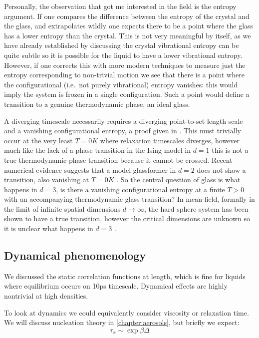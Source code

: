 Personally, the observation that got me interested in the field is the entropy argument.
If one compares the difference between the entropy of the crystal and the glass, and extrapolates wildly one expects there to be a point where the glass has a lower entropy than the crystal.
This is not very meaningful by itself, as we have already established by discussing the crystal vibrational entropy can be quite subtle so it is possible for the liquid to have a lower vibrational entropy.
However, if one corrects this with more modern techniques to measure just the entropy corresponding to non-trivial motion we see that there is a point where the configurational (i.e.\ not purely vibrational) entropy vanishes: this would imply the system is frozen in a single configuration.
Such a point would define a transition to a genuine thermodynamic phase, an ideal glass.

A diverging timescale necessarily requires a diverging point-to-set length scale and a vanishing configurational entropy, a proof given in \cite{?}.
This must trivially occur at the very least $T=0\si{K}$ where relaxation timescales diverges, however much like the lack of a phase transition in the Ising model in $d=1$ this is not a true thermodynamic phase transition because it cannot be crossed.
Recent numerical evidence suggests that a model glassformer in $d=2$ does not show a transition, also vanishing at $T=0\si{K}$ \cite{Berthier?}.
So the central question of glass is what happens in $d=3$, is there a vanishing configurational entropy at a finite $T > 0$ with an accompanying thermodynamic glass transition?
In mean-field, formally in the limit of infinite spatial dimensions $d \to \infty$, the hard sphere system has been shown to have a true transition, however the critical dimensions are unknown so it is unclear what happens in $d=3$ \cite{Parisi,Zamboni,Charbonneau,Kurchan,?,?}.


\subsection{Dynamical phenomenology}

We discussed the static correlation functions at length, which is fine for liquids where equilibrium occurs on 10ps timescale.
Dynamical effects are highly nontrivial at high densities.

To look at dynamics we could equivalently consider viscosity or relaxation time.
We will discuss nucleation theory in \ref{chapter:aerosols}, but briefly we expect:
\begin{equation*}
  \tau_x \sim \exp{ \beta \Delta}
\end{equation*}

